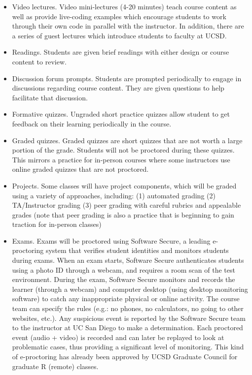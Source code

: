 \documentclass[11pt,letterpaper]{article}
\begin{document}
\begin{itemize}
\item Video lectures​. Video mini-lectures (4-20 minutes) teach
  course content as well as provide live-coding examples which
  encourage students to work through their own code in parallel with
  the instructor. In addition, there are a series of guest lectures
  which introduce students to faculty at UCSD.
\item Readings​. Students
  are given brief readings with either design or course content to
  review.
\item Discussion forum prompts​. Students are prompted
  periodically to engage in discussions regarding course content. They
  are given questions to help facilitate that discussion.
\item  Formative
  quizzes​. Ungraded short practice quizzes allow student to get
  feedback on their learning periodically in the course.
\item  Graded
  quizzes. ​Graded quizzes are short quizzes that are not worth a large
  portion of the grade. Students will not be proctored during these
  quizzes. This mirrors a practice for in-person courses where some
  instructors use online graded quizzes that are not proctored.
\item Projects. Some classes will have project components, which will
  be graded using a variety of approaches, including: (1) automated
  grading (2) TA/Instructor grading (3) peer grading with careful
  rubrics and appealable grades (note that peer grading is also a
  practice that is beginning to gain traction for in-person classes)
\item Exams. ​Exams will be proctored using Software Secure, a leading
  e-proctoring system that verifies student identities and monitors
  students during exams. When an exam starts, Software Secure
  authenticates students using a photo ID through a webcam, and
  requires a room scan of the test environment. During the exam,
  Software Secure monitors and records the learner (through a webcam)
  and computer desktop (using desktop monitoring software) to catch
  any inappropriate physical or online activity. The course team can
  specify the rules (e.g.: no phones, no calculators, no going to
  other websites, etc.). Any suspicious event is reported by the
  Software Secure team to the instructor at UC San Diego to make a
  determination. Each proctored event (audio + video) is recorded and
  can later be replayed to look at problematic cases, thus providing a
  significant level of monitoring. This kind of e-proctoring has
  already been approved by UCSD Graduate Council for graduate R
  (remote) classes.
\end{itemize}
\end{document}

